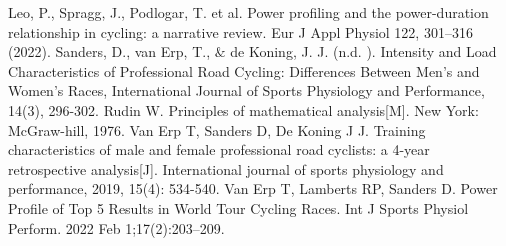 \begin{thebibliography}{99}

 Leo, P., Spragg, J., Podlogar, T. et al. Power profiling and the power-duration relationship in cycling: a narrative review. Eur J Appl Physiol 122, 301–316 (2022).
 Sanders, D., van Erp, T., $\&$ de Koning, J. J. (n.d. ). Intensity and Load Characteristics of Professional Road Cycling: Differences Between Men’s and Women’s Races, International Journal of Sports Physiology and Performance, 14(3), 296-302.
 Rudin W. Principles of mathematical analysis[M]. New York: McGraw-hill, 1976.
 Van Erp T, Sanders D, De Koning J J. Training characteristics of male and female professional road cyclists: a 4-year retrospective analysis[J]. International journal of sports physiology and performance, 2019, 15(4): 534-540.
 Van Erp T, Lamberts RP, Sanders D. Power Profile of Top 5 Results in World Tour Cycling Races. Int J Sports Physiol Perform. 2022 Feb 1;17(2):203–209.





\end{thebibliography}